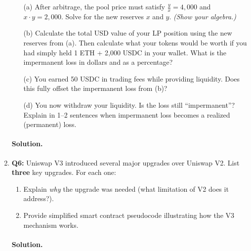 \documentclass{article}
\begin{document}
\begin{enumerate}
    \begin{itemize}
        \item[(a)] After arbitrage, the pool price must satisfy $\frac{y}{x} = 4{,}000$ and $x \cdot y = 2{,}000$. Solve for the new reserves $x$ and $y$. \textit{(Show your algebra.)}
        \item[(b)] Calculate the total USD value of your LP position using the new reserves from (a). Then calculate what your tokens would be worth if you had simply held 1 ETH + 2{,}000 USDC in your wallet. What is the impermanent loss in dollars and as a percentage?
        \item[(c)] You earned 50 USDC in trading fees while providing liquidity. Does this fully offset the impermanent loss from (b)?
        \item[(d)] You now withdraw your liquidity. Is the loss still ``impermanent''? Explain in 1--2 sentences when impermanent loss becomes a realized (permanent) loss.
    \end{itemize}

    \paragraph{Solution.}

    \vspace{3em}

    \item \textbf{Q6:} Uniswap V3 introduced several major upgrades over Uniswap V2. List \textbf{three} key upgrades. For each one:

    \begin{enumerate}
        \item Explain \textit{why} the upgrade was needed (what limitation of V2 does it address?).
        \item Provide simplified smart contract pseudocode illustrating how the V3 mechanism works.
    \end{enumerate}

    \paragraph{Solution.}

    \vspace{3em}

\end{enumerate}
\end{document}
